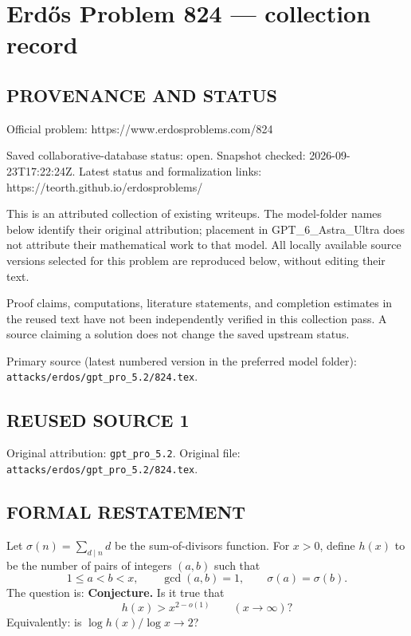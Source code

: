 \section*{Erd\H{o}s Problem 824 --- collection record}

\subsection*{PROVENANCE AND STATUS}
Official problem: https://www.erdosproblems.com/824

Saved collaborative-database status: open.
Snapshot checked: 2026-09-23T17:22:24Z.
Latest status and formalization links: https://teorth.github.io/erdosproblems/

This is an attributed collection of existing writeups. The model-folder names below identify their original attribution; placement in GPT\_6\_Astra\_Ultra does not attribute their mathematical work to that model. All locally available source versions selected for this problem are reproduced below, without editing their text.

Proof claims, computations, literature statements, and completion estimates in the reused text have not been independently verified in this collection pass. A source claiming a solution does not change the saved upstream status.

Primary source (latest numbered version in the preferred model folder): \texttt{attacks/erdos/gpt\_pro\_5.2/824.tex}.

\subsection*{REUSED SOURCE 1}
Original attribution: \texttt{gpt\_pro\_5.2}.
Original file: \texttt{attacks/erdos/gpt\_pro\_5.2/824.tex}.


\subsection*{FORMAL RESTATEMENT}
Let $\sigma(n)=\sum_{d\mid n} d$ be the sum-of-divisors function. For $x>0$, define $h(x)$ to be the number of pairs of integers $(a,b)$ such that
\[
1\le a<b<x,\qquad \gcd(a,b)=1,\qquad \sigma(a)=\sigma(b).
\]
The question is:
\medskip
\noindent\textbf{Conjecture.} Is it true that
\[
 h(x) > x^{2-o(1)}\qquad (x\to\infty)?
\]
Equivalently: is $\log h(x) / \log x \to 2$?

